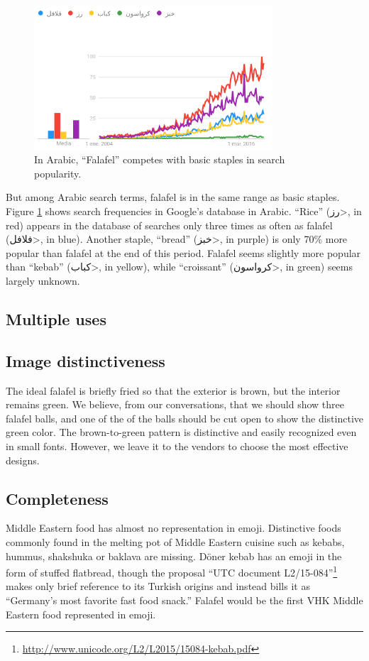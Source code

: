 \documentclass[a4paper,10pt]{article}
\begin{document}
\begin{figure}
\begin{center}
\includegraphics[width=3.5in]{atrends.png}
\end{center}
\caption{In Arabic, ``Falafel'' competes with basic staples in search popularity.}
\label{aplot}
\end{figure}

But among Arabic search terms, falafel is in the same range as basic staples. 
Figure \ref{aplot} shows search frequencies in Google's database in Arabic.
``Rice'' (\<رز>, in red) appears in the database of searches only three times as often as
falafel (\<فلافل>, in blue).  Another staple, ``bread'' (\<خبز>, in purple) is only 70\% more
popular than falafel at the end of this period. Falafel seems slightly more popular than ``kebab'' (\<كباب>,
in yellow), while ``croissant'' (\<كرواسون>, in green) seems largely unknown.


\subsection{Multiple uses}



\subsection{Image distinctiveness}
The ideal falafel is briefly fried so that the exterior is brown, but the interior remains green. We believe, from
our conversations, that we should show three falafel balls, and one of the of the balls should be cut open to show
the distinctive green color. The brown-to-green pattern is distinctive and easily recognized even in small fonts.
However, we leave it to the vendors to choose the most effective designs.

\subsection{Completeness}
Middle Eastern food has almost no representation in emoji. Distinctive foods
commonly found in the melting pot of Middle Eastern cuisine such as kebabs, hummus, shakshuka or
baklava are missing.  Döner kebab has an emoji in the form
of {\sc stuffed flatbread}, though the proposal ``UTC document
L2/15-084''\footnote{\url{http://www.unicode.org/L2/L2015/15084-kebab.pdf}} makes
only brief reference to its Turkish origins and instead bills it as ``Germany's most
favorite fast food snack.''  {\sc Falafel} would be the first VHK Middle Eastern food
represented in emoji.
\end{document}
